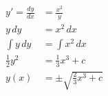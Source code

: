\documentclass[diffeq.tex]{subfiles}
\begin{document}
    \begin{homework}
        \begin{align}
            y' = \frac{dy}{dx} &= \frac{x^{2}}{y}\\
            y\,dy &= x^{2}\,dx\\
            \int y\,dy &= \int x^{2}\,dx\\
            \frac{1}{2}y^{2} &= \frac{1}{3}x^{3} + c\\
            y(x) &= \pm \sqrt{\frac{2}{3}x^{3} + c}
        \end{align}
    \end{homework}
\end{document}
